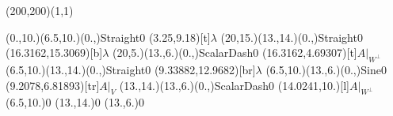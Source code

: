 \unitlength=1bp%

\begin{feynartspicture}(200,200)(1,1)

\FADiagram{}
\FAProp(0.,10.)(6.5,10.)(0.,){Straight}{0}
\FALabel(3.25,9.18)[t]{$\lambda$}
\FAProp(20,15.)(13.,14.)(0.,){Straight}{0}
\FALabel(16.3162,15.3069)[b]{$\lambda$}
\FAProp(20,5.)(13.,6.)(0.,){ScalarDash}{0}
\FALabel(16.3162,4.69307)[t]{$A|_{W^\perp}$}
\FAProp(6.5,10.)(13.,14.)(0.,){Straight}{0}
\FALabel(9.33882,12.9682)[br]{$\lambda$}
\FAProp(6.5,10.)(13.,6.)(0.,){Sine}{0}
\FALabel(9.2078,6.81893)[tr]{$A|_V$}
\FAProp(13.,14.)(13.,6.)(0.,){ScalarDash}{0}
\FALabel(14.0241,10.)[l]{$A|_{W^\perp}$}
\FAVert(6.5,10.){0}
\FAVert(13.,14.){0}
\FAVert(13.,6.){0}
\end{feynartspicture}

